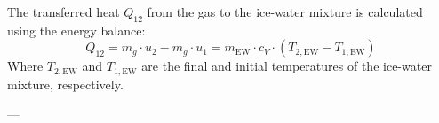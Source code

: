 The transferred heat \( Q_{12} \) from the gas to the ice-water mixture is calculated using the energy balance:  
\[
Q_{12} = m_g \cdot u_2 - m_g \cdot u_1 = m_{\text{EW}} \cdot c_V \cdot (T_{2,\text{EW}} - T_{1,\text{EW}})
\]  
Where \( T_{2,\text{EW}} \) and \( T_{1,\text{EW}} \) are the final and initial temperatures of the ice-water mixture, respectively.  

---
